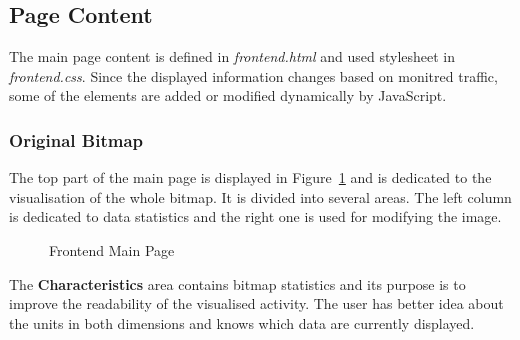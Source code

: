 \subsection{Page Content}
The main page content is defined in \textit{frontend.html} and used stylesheet
in \textit{frontend.css}. Since the
displayed information changes based on monitred traffic, some of the elements
are added or modified dynamically by JavaScript.

\subsubsection{Original Bitmap}
The top part of the main page is displayed in Figure~\ref{fig:main_page} and
is dedicated to the visualisation of the whole bitmap.
It is divided into several areas. The left column is dedicated to data
statistics and the right one is used for modifying the image.

\begin{figure}[H]
   \begin{center}
		 \hfill
      \caption{Frontend Main Page} \label{fig:main_page}
	\end{center}
\end{figure}

The \textbf{Characteristics} area contains bitmap statistics and its purpose
is to improve the readability of the visualised activity. The user has
better idea about the units in both dimensions and knows which data are
currently displayed.

